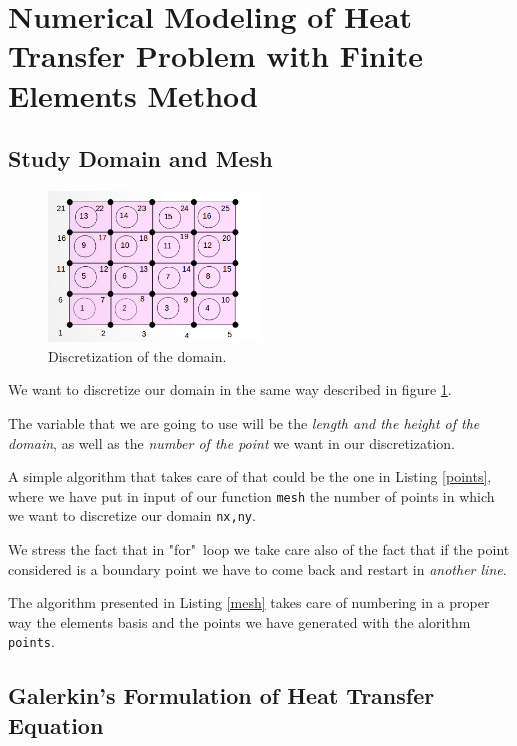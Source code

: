 
\section{Numerical Modeling of Heat Transfer Problem with Finite Elements Method}
\subsection{Study Domain and Mesh}
\label{sec:4.1}
\begin{figure}
	\centering
	\includegraphics[height=4cm]{Images/mesh.png}
	\caption{Discretization of the domain.}
	\label{figure:mesh}
\end{figure}
\begin{mdframed}
	We want to discretize our domain in the same way described in figure \ref{figure:mesh}.
	
	The variable that we are going to use will be the \emph{length and the height of the domain}, as well as the \emph{number of the point} we want in our discretization. 
	
	A simple algorithm that takes care of that could be the one in Listing \ref{points}, where we have put in input of our function \texttt{mesh} the number of points in which we want to discretize our domain \texttt{nx,ny}.   
	
	We stress the fact that in "for"~loop we take care also of the fact that if the point considered is a boundary point we have to come back and restart in \emph{another line}.
	
	The algorithm presented in Listing \ref{mesh} takes care of numbering in a proper way the elements basis and the points we have generated with the alorithm \texttt{points}.
	
\end{mdframed}
\subsection{Galerkin’s Formulation of Heat Transfer Equation}
